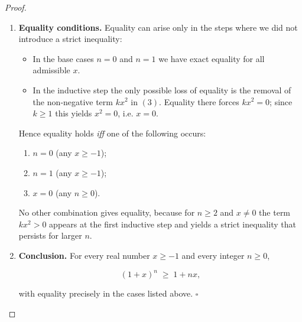 \begin{proof}
\begin{enumerate}
\begin{enumerate}
Combining (1), (2) and (3) we obtain  

\[
(1+x)^{k+1}\;\ge\;1+(k+1)x .
\]

Thus the statement holds for \(n=k+1\).
\end{enumerate}
By the principle of mathematical induction, \((\text{H}_n)\) is true for every integer \(n\ge0\); i.e.

\[
(1+x)^{n}\;\ge\;1+nx \qquad\forall\,x\ge-1,\; n\in\mathbb{N}_{0}. \tag{*}
\]

\item \textbf{Equality conditions.}  
Equality can arise only in the steps where we did not introduce a strict inequality:

\begin{itemize}
\item In the base cases \(n=0\) and \(n=1\) we have exact equality for all admissible \(x\).
\item In the inductive step the only possible loss of equality is the removal of the non‑negative term \(kx^{2}\) in \((3)\). Equality there forces \(kx^{2}=0\); since \(k\ge1\) this yields \(x^{2}=0\), i.e. \(x=0\).
\end{itemize}

Hence equality holds \emph{iff} one of the following occurs:
\begin{enumerate}
\item \(n=0\) (any \(x\ge-1\));
\item \(n=1\) (any \(x\ge-1\));
\item \(x=0\) (any \(n\ge0\)).
\end{enumerate}
No other combination gives equality, because for \(n\ge2\) and \(x\neq0\) the term \(kx^{2}>0\) appears at the first inductive step and yields a strict inequality that persists for larger \(n\).

\item \textbf{Conclusion.}  
For every real number \(x\ge-1\) and every integer \(n\ge0\),

\[
\boxed{(1+x)^{n}\;\ge\;1+nx},
\]

with equality precisely in the cases listed above. \(\square\)
\end{enumerate}
\end{proof}